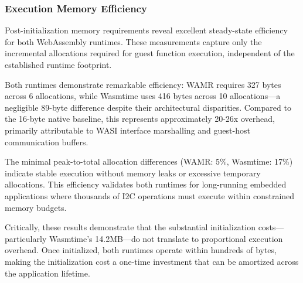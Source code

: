 

\subsubsection{Execution Memory Efficiency}

Post-initialization memory requirements reveal excellent steady-state efficiency for both WebAssembly runtimes. These measurements capture only the incremental allocations required for guest function execution, independent of the established runtime footprint.

Both runtimes demonstrate remarkable efficiency: WAMR requires 327 bytes across 6 allocations, while Wasmtime uses 416 bytes across 10 allocations—a negligible 89-byte difference despite their architectural disparities. Compared to the 16-byte native baseline, this represents approximately 20-26x overhead, primarily attributable to WASI interface marshalling and guest-host communication buffers.

The minimal peak-to-total allocation differences (WAMR: 5\%, Wasmtime: 17\%) indicate stable execution without memory leaks or excessive temporary allocations. This efficiency validates both runtimes for long-running embedded applications where thousands of I2C operations must execute within constrained memory budgets.

Critically, these results demonstrate that the substantial initialization costs—particularly Wasmtime's 14.2MB—do not translate to proportional execution overhead. Once initialized, both runtimes operate within hundreds of bytes, making the initialization cost a one-time investment that can be amortized across the application lifetime.

